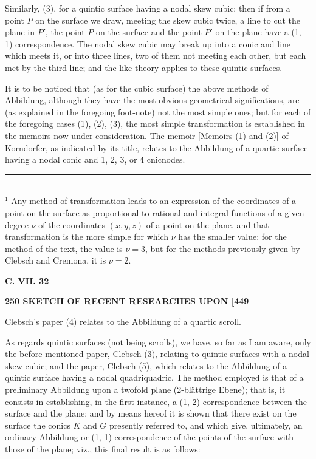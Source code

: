 \documentclass[11pt]{article}
\begin{document}
Similarly, (3), for a quintic surface having a nodal skew cubic; then if from a
point $P$ on the surface we draw, meeting the skew cubic twice, a line to cut the
plane in $P'$, the point $P$ on the surface and the point $P'$ on the plane have a (1, 1)
correspondence. The nodal skew cubic may break up into a conic and line which
meets it, or into three lines, two of them not meeting each other, but each met by
the third line; and the like theory applies to these quintic surfaces.

It is to be noticed that (as for the cubic surface) the above methods of Abbildung,
although they have the most obvious geometrical significations, are (as explained in the
foregoing foot-note) not the most simple ones; but for each of the foregoing cases (1),
(2), (3), the most simple transformation is established in the memoirs now under con\-sideration.
The memoir [Memoirs (1) and (2)] of Korndorfer, as indicated by its title, relates
to the Abbildung of a quartic surface having a nodal conic and 1, 2, 3, or 4 cnicnodes.

\vfill
\noindent\rule{2cm}{0.4pt}\\
\footnotesize $^{1}$ Any method of transformation leads to an expression of the coordinates of a point on the surface as
proportional to rational and integral functions of a given degree $\nu$ of the coordinates $(x, y, z)$ of a point on
the plane, and that transformation is the more simple for which $\nu$ has the smaller value: for the method
of the text, the value is $\nu = 3$, but for the methods previously given by Clebsch and Cremona, it is $\nu = 2$.
\normalsize

\medskip
\noindent\textbf{C. VII. \hfill 32}

\medskip
\noindent\textbf{250 \hfill SKETCH OF RECENT RESEARCHES UPON \hfill [449}

\medskip

Clebsch's paper (4) relates to the Abbildung of a quartic scroll.

As regards quintic surfaces (not being scrolls), we have, so far as I am aware,
only the before-mentioned paper, Clebsch (3), relating to quintic surfaces with a nodal
skew cubic; and the paper, Clebsch (5), which relates to the Abbildung of a quintic
surface having a nodal quadriquadric. The method employed is that of a preliminary
Abbildung upon a twofold plane (2-bl\"attrige Ebene); that is, it consists in establishing,
in the first instance, a (1, 2) correspondence between the surface and the plane; and
by means hereof it is shown that there exist on the surface the conics $K$ and $G$
presently referred to, and which give, ultimately, an ordinary Abbildung or (1, 1) corre\-spondence
of the points of the surface with those of the plane; viz., this final result
is as follows:
\end{document}
